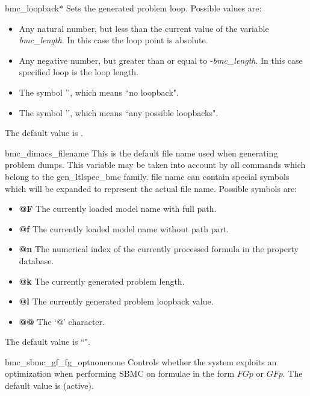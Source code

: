 \begin{nusmvVar} {bmc\_loopback}{}{*}
Sets the generated problem loop. Possible values are: 

\begin{itemize}
\item Any natural number, but less than the current value of
the variable \emph{bmc\_length}. In this case the loop point is absolute.
\item Any negative number, but greater than or equal to
-\emph{bmc\_length}. In this case specified loop is the loop length. 
\item The symbol '', which means ``no loopback".
\item The symbol '\varvalue{*}', which means ``any possible loopbacks".
\end{itemize}

The default value is \varvalue{*}.
\end{nusmvVar}

\begin{nusmvVar} {bmc\_dimacs\_filename}{}{}
This is the default file name used when generating \dimacs problem
dumps. This variable may be taken into account by all commands which
belong to the gen\_ltlspec\_bmc family.  \dimacs file name can contain
special symbols which will be expanded to represent the actual file
name. Possible symbols are:

\begin{itemize}
\item {\bf @F}
The currently loaded model name with full path. 
\item {\bf @f}
The currently loaded model name without path part. 
\item {\bf @n}
The numerical index of the currently processed formula in the property
database.
\item {\bf @k} 
The currently generated problem length. 
\item {\bf @l}
The currently generated problem loopback value.   
\item {\bf @@}
The `@' character.   
\end{itemize}

The default value is ``".
\end{nusmvVar}

\begin{nusmvVar} {bmc\_sbmc\_gf\_fg\_opt}{none}{none}
Controls whether the system exploits an optimization when performing
SBMC on formulae in the form $F G p$ or $G F p$. The default value is
 (active).
\end{nusmvVar}



